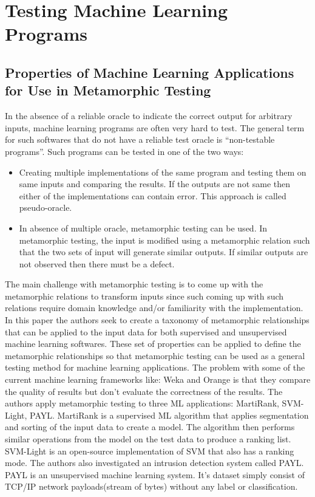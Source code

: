 \section{Testing Machine Learning Programs}
\subsection{Properties of Machine Learning Applications for Use in Metamorphic Testing \cite{Murphy}}
In the absence of a reliable oracle to indicate the correct output for arbitrary inputs, machine learning programs are often very hard to test. The general term for such softwares that do not have a reliable test oracle is “non-testable programs”. Such programs can be tested in one of the two ways:
\begin{itemize}
  \item Creating multiple implementations of the same program and testing them on same inputs and comparing the results. If the outputs are not same then either of the implementations can contain error. This approach is called pseudo-oracle.
  \item In absence of multiple oracle, metamorphic testing can be used. In metamorphic testing, the input is modified using a metamorphic relation such that the two sets of input will generate similar outputs. If similar outputs are not observed then there must be a defect.
\end{itemize}
The main challenge with metamorphic testing is to come up with the metamorphic relations to transform inputs since such coming up with such relations require domain knowledge and/or familiarity with the implementation.
In this paper the authors seek to create a taxonomy of metamorphic relationships that can be applied to the input data for both supervised and unsupervised machine learning softwares. These set of properties can be applied to define the metamorphic relationships so that metamorphic testing can be used as a general testing method for machine learning applications. The problem with some of the current machine learning frameworks like: Weka and Orange is that they compare the quality of results but don’t evaluate the correctness of the results. The authors apply metamorphic testing to three ML applications: MartiRank, SVM-Light, PAYL.
MartiRank is a supervised ML algorithm that applies segmentation and sorting of the input data to create a model. The algorithm then performs similar operations from the model on the test data to produce a ranking list. SVM-Light is an open-source implementation of SVM that also has a ranking mode. The authors also investigated an intrusion detection system called PAYL. PAYL is an unsupervised machine learning system. It’s dataset simply consist of TCP/IP network payloads(stream of bytes) without any label or classification.
